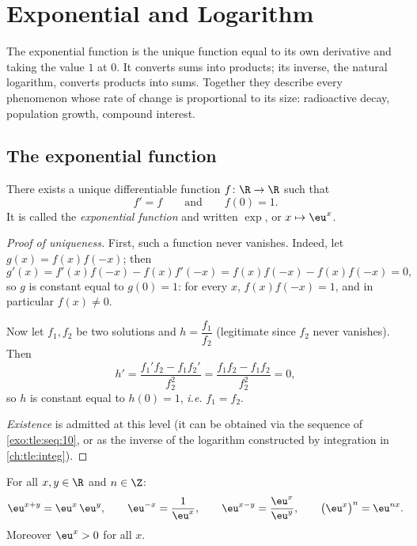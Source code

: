 \chapter{Exponential and Logarithm}\label{ch:tle:exp}

The exponential function is the unique function equal to its own derivative
and taking the value $1$ at $0$. It converts sums into products; its inverse,
the natural logarithm, converts products into sums. Together they describe
every phenomenon whose rate of change is proportional to its size:
radioactive decay, population growth, compound interest.

\section{The exponential function}

\begin{theorem}\label{thm:tle:exp:existence}
There exists a unique differentiable function $f \colon \R \to \R$ such that
\[
f' = f \qquad\text{and}\qquad f(0) = 1 .
\]
It is called the \emph{exponential function} and written
$\exp$, or $x \mapsto \eu^x$.
\end{theorem}

\begin{proof}[Proof of uniqueness]
First, such a function never vanishes. Indeed, let
$g(x) = f(x)f(-x)$; then
\[
g'(x) = f'(x)f(-x) - f(x)f'(-x) = f(x)f(-x) - f(x)f(-x) = 0,
\]
so $g$ is constant equal to $g(0) = 1$: for every $x$,
$f(x)f(-x) = 1$, and in particular $f(x) \neq 0$.

Now let $f_1, f_2$ be two solutions and $h = \dfrac{f_1}{f_2}$ (legitimate
since $f_2$ never vanishes). Then
\[
h' = \frac{f_1' f_2 - f_1 f_2'}{f_2^2} = \frac{f_1 f_2 - f_1 f_2}{f_2^2} = 0,
\]
so $h$ is constant equal to $h(0) = 1$, \emph{i.e.} $f_1 = f_2$.

\emph{Existence} is admitted at this level (it can be obtained via the
sequence of \cref{exo:tle:seq:10}, or as the inverse of the logarithm
constructed by integration in \cref{ch:tle:integ}).
\end{proof}

\begin{proposition}\label{prop:tle:exp:funceq}
For all $x, y \in \R$ and $n \in \Z$:
\[
\eu^{x+y} = \eu^x\,\eu^y, \qquad
\eu^{-x} = \frac{1}{\eu^x}, \qquad
\eu^{x-y} = \frac{\eu^x}{\eu^y}, \qquad
\bigl(\eu^{x}\bigr)^n = \eu^{nx}.
\]
Moreover $\eu^x > 0$ for all $x$.
\end{proposition}


